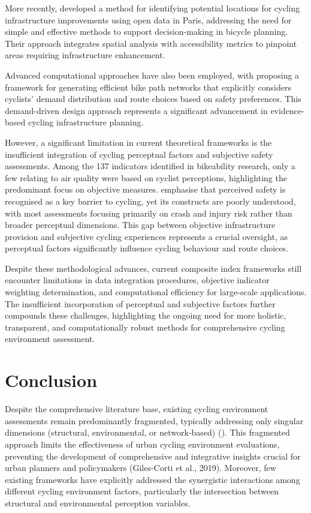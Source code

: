 \documentclass[
  12pt,
  oneside]{book}
\begin{document}
More recently, \textcite{wysling_where_2022} developed a method for identifying potential locations for cycling infrastructure improvements using open data in Paris, addressing the need for simple and effective methods to support decision-making in bicycle planning. Their approach integrates spatial analysis with accessibility metrics to pinpoint areas requiring infrastructure enhancement.

Advanced computational approaches have also been employed, with \textcite{steinacker_demand-driven_2022} proposing a framework for generating efficient bike path networks that explicitly considers cyclists' demand distribution and route choices based on safety preferences. This demand-driven design approach represents a significant advancement in evidence-based cycling infrastructure planning.

However, a significant limitation in current theoretical frameworks is the insufficient integration of cycling perceptual factors and subjective safety assessments. Among the 137 indicators identified in bikeability research, only a few relating to air quality were based on cyclist perceptions, highlighting the predominant focus on objective measures. \textcite{duren_identifying_2023} emphasise that perceived safety is recognised as a key barrier to cycling, yet its constructs are poorly understood, with most assessments focusing primarily on crash and injury risk rather than broader perceptual dimensions. This gap between objective infrastructure provision and subjective cycling experiences represents a crucial oversight, as perceptual factors significantly influence cycling behaviour and route choices.

Despite these methodological advances, current composite index frameworks still encounter limitations in data integration procedures, objective indicator weighting determination, and computational efficiency for large-scale applications. The insufficient incorporation of perceptual and subjective factors further compounds these challenges, highlighting the ongoing need for more holistic, transparent, and computationally robust methods for comprehensive cycling environment assessment.

\section{Conclusion}\label{conclusion}

Despite the comprehensive literature base, existing cycling environment assessments remain predominantly fragmented, typically addressing only singular dimensions (structural, environmental, or network-based) (\textcite{muhs_characteristics_2016}). This fragmented approach limits the effectiveness of urban cycling environment evaluations, preventing the development of comprehensive and integrative insights crucial for urban planners and policymakers (Giles-Corti et al., 2019). Moreover, few existing frameworks have explicitly addressed the synergistic interactions among different cycling environment factors, particularly the intersection between structural and environmental perception variables.
\end{document}
